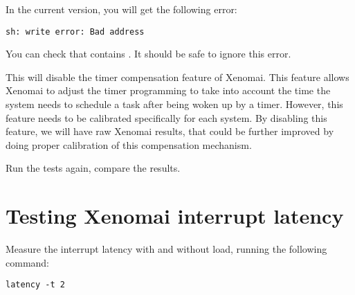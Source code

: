 In the current version, you will get the following error:

\begin{verbatim}
sh: write error: Bad address
\end{verbatim}

You can check that  contains . It
should be safe to ignore this error.

This will disable the timer compensation feature of Xenomai. This
feature allows Xenomai to adjust the timer programming to take into
account the time the system needs to schedule a task after being woken
up by a timer. However, this feature needs to be calibrated
specifically for each system. By disabling this feature, we will have
raw Xenomai results, that could be further improved by doing proper
calibration of this compensation mechanism.

Run the tests again, compare the results.

\section{Testing Xenomai interrupt latency}

Measure the interrupt latency with and without load, running the
following command:

\begin{verbatim}
latency -t 2
\end{verbatim}
